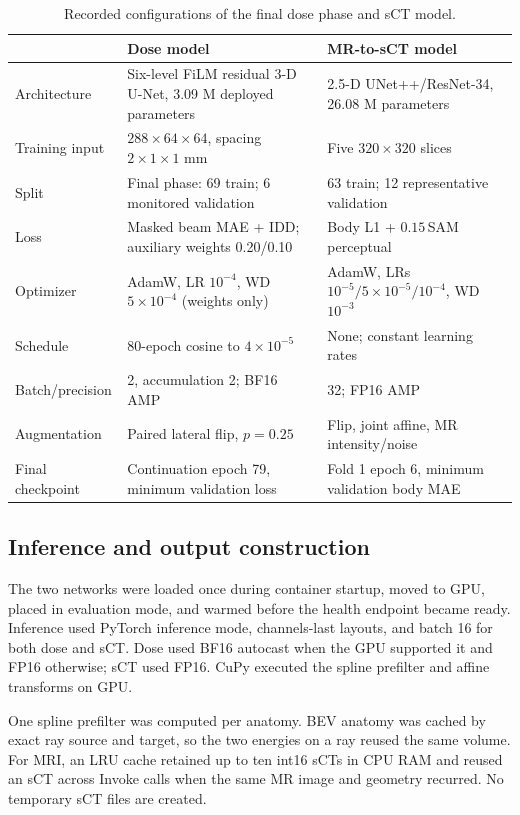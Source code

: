 \documentclass[runningheads]{llncs}
\begin{document}
\begin{table}[t]
\caption{Recorded configurations of the final dose phase and sCT model.}
\label{tab:training}
\centering
\small
\setlength{\tabcolsep}{3.2pt}
\begin{tabularx}{\textwidth}{@{}p{2.4cm}YY@{}}
\toprule
 & Dose model & MR-to-sCT model \\
\midrule
Architecture & Six-level FiLM residual 3-D U-Net, 3.09 M deployed parameters & 2.5-D UNet++/ResNet-34, 26.08 M parameters \\
Training input & $288\times64\times64$, spacing $2\times1\times1$ mm & Five $320\times320$ slices \\
Split & Final phase: 69 train; 6 monitored validation & 63 train; 12 representative validation \\
Loss & Masked beam MAE + IDD; auxiliary weights 0.20/0.10 & Body L1 + $0.15\,$SAM perceptual \\
Optimizer & AdamW, LR $10^{-4}$, WD $5\times10^{-4}$ (weights only) & AdamW, LRs $10^{-5}/5\times10^{-5}/10^{-4}$, WD $10^{-3}$ \\
Schedule & 80-epoch cosine to $4\times10^{-5}$ & None; constant learning rates \\
Batch/precision & 2, accumulation 2; BF16 AMP & 32; FP16 AMP \\
Augmentation & Paired lateral flip, $p=0.25$ & Flip, joint affine, MR intensity/noise \\
Final checkpoint & Continuation epoch 79, minimum validation loss & Fold 1 epoch 6, minimum validation body MAE \\
\bottomrule
\end{tabularx}
\end{table}

\subsection{Inference and output construction}

The two networks were loaded once during container startup, moved to GPU,
placed in evaluation mode, and warmed before the health endpoint became ready.
Inference used PyTorch inference mode, channels-last
layouts, and batch 16 for both dose and sCT. Dose used BF16 autocast when the
GPU supported it and FP16 otherwise; sCT used FP16. CuPy executed the spline
prefilter and affine transforms on GPU.

One spline prefilter was computed per anatomy. BEV anatomy was cached by exact
ray source and target, so the two energies on a ray reused the same volume.
For MRI, an LRU cache retained up to ten int16 sCTs in CPU RAM and reused an
sCT across Invoke calls when the same MR image and geometry recurred. No
temporary sCT files are created.
\end{document}
